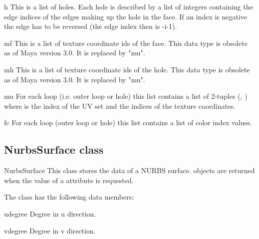 \begin{memberdesc}{h}
This is a list of holes. Each hole is described by a list of integers 
containing the edge indices of the edges 
making up the hole in the face. If an index is negative the edge has to be
reversed (the edge index then is -i-1).
\end{memberdesc}

\begin{memberdesc}{mf}
This is a list of texture coordinate ids of the face. This data type
is obsolete as of Maya version 3.0. It is replaced by "mu".
\end{memberdesc}

\begin{memberdesc}{mh}
This is a list of texture coordinate ids of the hole. This data type
is obsolete as of Maya version 3.0. It is replaced by "mu".
\end{memberdesc}

\begin{memberdesc}{mu}
For each loop (i.e. outer loop or hole) this list contains a list of
2-tuples (, ) where  is the index of
the UV set and  the indices of the texture coordinates.
\end{memberdesc}

\begin{memberdesc}{fc}
For each loop (outer loop or hole) this list contains a list of color 
index values.
\end{memberdesc}

\subsection{NurbsSurface class}
\label{nurbssurface}

\begin{classdesc*}{NurbsSurface}
This class stores the data of a NURBS surface.  objects
are returned when the value of a  attribute is requested.
\end{classdesc*}

The class has the following data members:

\begin{memberdesc}{udegree}
Degree in u direction.
\end{memberdesc}

\begin{memberdesc}{vdegree}
Degree in v direction.
\end{memberdesc}

